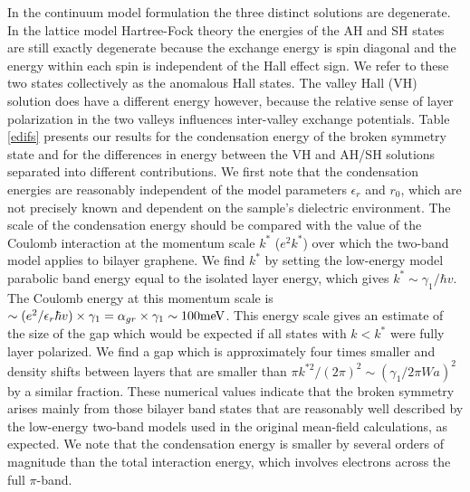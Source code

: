 \documentclass[twocolumn,prb,showpacs,preprintnumbers,amsmath,amssymb]{revtex4}
\begin{document}
In the continuum model formulation the three distinct solutions are degenerate. 
In the lattice model Hartree-Fock theory the energies of the AH and SH states
are still exactly degenerate because the exchange energy is spin
diagonal and the energy within each spin is independent of the Hall effect sign.
We refer to these two states collectively as the anomalous Hall states.
The valley Hall (VH) solution does have a different energy however, because 
the relative sense of layer polarization in the two valleys influences inter-valley exchange potentials.
Table \ref{edifs} presents our results for the condensation energy of the broken symmetry state and 
for the differences in energy between the VH and AH/SH solutions separated into different contributions.
We first note that the condensation energies are reasonably independent of the model 
parameters $\epsilon_r$ and $r_0$, which are not precisely known and dependent on the 
sample's dielectric environment.  The scale of the condensation energy 
should be compared with the value of the Coulomb interaction at the momentum scale $k^*$ ($e^2 k^*$) 
over which the two-band model applies to bilayer graphene.  We find $k^*$ by 
setting the low-energy model parabolic band energy equal to the isolated layer energy, 
which gives $k^* \sim \gamma_1/\hbar v$.  The Coulomb energy at this momentum scale is 
$\sim (e^2/\epsilon_r \hbar v) \times \gamma_1 = \alpha_{gr} \times \gamma_1 \sim 100 {\rm meV}$.
This energy scale gives an estimate of the size of the gap which would be expected if 
all states with $k < k^*$ were fully layer polarized.  We find a gap which is approximately
four times smaller and density shifts between layers that are smaller than 
$\pi k^{*2} /(2\pi)^2 \sim (\gamma_1/2 \pi W a)^2 $ by a similar fraction.
These numerical values indicate that the broken symmetry arises mainly from those 
bilayer band states that are reasonably well described by the low-energy
two-band models used in the original mean-field calculations, as expected. 
We note that the condensation energy is smaller by several orders of magnitude than the 
total interaction energy, which involves electrons across the full $\pi$-band. 
\end{document}
